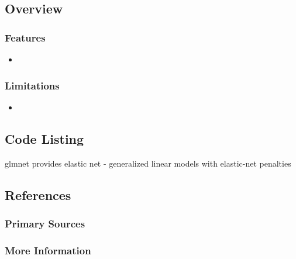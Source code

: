 \subsection{Overview}

\subsubsection{Features}

\begin{itemize}
	\item 
\end{itemize}

\subsubsection{Limitations}

\begin{itemize}
	\item 
\end{itemize}


\subsection{Code Listing}


glmnet provides elastic net - generalized linear models with elastic-net penalties



\subsection{References}

\subsubsection{Primary Sources}


\subsubsection{More Information}



